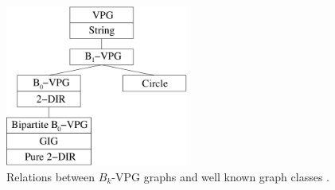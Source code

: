 \begin{figure}[htb]	
\center%
\includegraphics[width=6cm]{./img/hierarquiaVPG.png}
\caption{Relations between $B_k$-VPG graphs and well known graph classes \cite{asinowski2012}. }
\label{fig:hierarquiaVPG}
\end{figure}